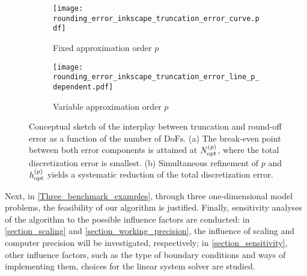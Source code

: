 \documentclass[final,3p]{elsarticle}
\begin{document}


\begin{figure}[!ht]
\hspace{2.0cm}
\begin{subfigure}[t]{0.35\textwidth}
      \texttt{[image: rounding\_error\_inkscape\_truncation\_error\_curve.pdf]}
      \caption{Fixed approximation order $p$}
\end{subfigure}
\hspace{0.5cm}
\begin{subfigure}[t]{0.35\textwidth}
      \texttt{[image: rounding\_error\_inkscape\_truncation\_error\_line\_p\_dependent.pdf]}
      \caption{Variable approximation order $p$}
\end{subfigure}
\caption{Conceptual sketch of the interplay between truncation and round-off error as a function of the number of $\text{DoFs}$. (a) The break-even point between both error components is attained at $N_{\rm opt}^{(p)}$, where the total discretization error is smallest. (b) Simultaneous refinement of $p$ and $h_{\rm opt}^{(p)}$ yields a systematic reduction of the total discretization error.}
\label{Fig:rounding_error_inkscape}
\end{figure}


Next, in \cref{Three_benchmark_examples}, through three one-dimensional model problems, the feasibility of our algorithm is justified. Finally, sensitivity analyses of the algorithm to the possible influence factors are conducted: 
in \cref{section_scaling} and \cref{section_working_precision}, the influence of scaling and computer precision will be investigated, respectively;
in \cref{section_sensitivity}, other influence factors, such as the type of boundary conditions and ways of implementing them, choices for the linear system solver are studied.

\end{document}
